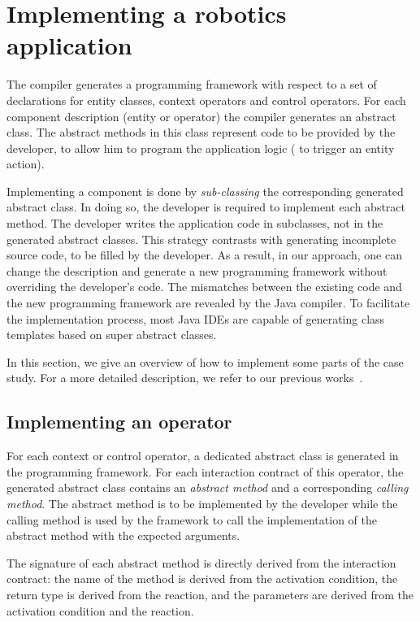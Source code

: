 \section{Implementing a robotics application}
\label{sec:implementing}

The \diaspec{} compiler generates a programming framework with respect
to a set of declarations for entity classes, context operators and
control operators. For each component description (entity or operator)
the compiler generates an abstract class. The abstract methods in this
class represent code to be provided by the developer, to allow him to
program the application logic (\eg{} to trigger an entity action). 

Implementing a \diaspec{} component is done by \textit{sub-classing}
the corresponding generated abstract class. In doing so, the developer
is required to implement each abstract method. The developer writes
the application code in subclasses, not in the generated abstract
classes. This strategy contrasts with generating incomplete source
code, to be filled by the developer. As a result, in our approach, one
can change the \diaspec{} description and generate a new programming
framework without overriding the developer's code. The mismatches
between the existing code and the new programming framework are
revealed by the Java compiler. To facilitate the implementation
process, most Java IDEs are capable of generating class templates
based on super abstract classes.

In this section, we give an overview of how to implement some parts of
the case study. For a more detailed description, we refer to our
previous works~\cite{Cass09b,Cass11a,Cass11b}.

\subsection{Implementing an operator}

For each context or control operator, a dedicated abstract class is
generated in the programming framework. For each interaction contract
of this operator, the generated abstract class contains an
\emph{abstract method} and a corresponding \emph{calling method}. The
abstract method is to be implemented by the developer while the
calling method is used by the framework to call the implementation of
the abstract method with the expected arguments.

The signature of each abstract method is directly derived from the
interaction contract: the name of the method is derived from the
activation condition, the return type is derived from the reaction,
and the parameters are derived from the activation condition and the
reaction.

